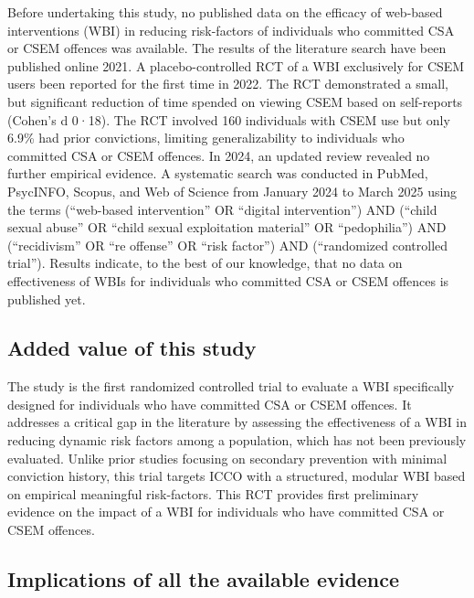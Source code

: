 \documentclass[
  super,
  preprint,
  1p,
  onecolumn]{elsarticle}
\begin{document}
Before undertaking this study, no published data on the efficacy of
web-based interventions (WBI) in reducing risk-factors of individuals
who committed CSA or CSEM offences was available. The results of the
literature search have been published online 2021. A placebo-controlled
RCT of a WBI exclusively for CSEM users been reported for the first time
in 2022. The RCT demonstrated a small, but significant reduction of time
spended on viewing CSEM based on self-reports (Cohen's d 0·18). The RCT
involved 160 individuals with CSEM use but only 6.9\% had prior
convictions, limiting generalizability to individuals who committed CSA
or CSEM offences. In 2024, an updated review revealed no further
empirical evidence. A systematic search was conducted in PubMed,
PsycINFO, Scopus, and Web of Science from January 2024 to March 2025
using the terms (``web-based intervention'' OR ``digital intervention'')
AND (``child sexual abuse'' OR ``child sexual exploitation material'' OR
``pedophilia'') AND (``recidivism'' OR ``re offense'' OR ``risk
factor'') AND (``randomized controlled trial''). Results indicate, to
the best of our knowledge, that no data on effectiveness of WBIs for
individuals who committed CSA or CSEM offences is published yet.

\subsection*{Added value of this study}\label{added-value-of-this-study}

The study is the first randomized controlled trial to evaluate a WBI
specifically designed for individuals who have committed CSA or CSEM
offences. It addresses a critical gap in the literature by assessing the
effectiveness of a WBI in reducing dynamic risk factors among a
population, which has not been previously evaluated. Unlike prior
studies focusing on secondary prevention with minimal conviction
history, this trial targets ICCO with a structured, modular WBI based on
empirical meaningful risk-factors. This RCT provides first preliminary
evidence on the impact of a WBI for individuals who have committed CSA
or CSEM offences.

\subsection*{Implications of all the available
evidence}\label{implications-of-all-the-available-evidence}
\end{document}
